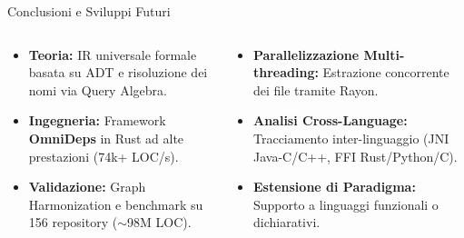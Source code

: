 \documentclass[aspectratio=169,10pt]{beamer}
\begin{document}
\begin{frame}{Conclusioni e Sviluppi Futuri}
  \vspace{0.1em}
  \begin{columns}[c,onlytextwidth]
      \begin{cookiecard}[title={Contributi Principali}]
        \small
        \begin{itemize}\setlength{\itemsep}{0.2em}
          \item \textbf{Teoria:} IR universale formale basata su ADT e risoluzione dei nomi via Query Algebra.
          \item \textbf{Ingegneria:} Framework \textbf{OmniDeps} in Rust ad alte prestazioni (74k+ LOC/s).
          \item \textbf{Validazione:} Graph Harmonization e benchmark su 156 repository ($\sim$98M LOC).
        \end{itemize}
      \end{cookiecard}

      \begin{cookiecard}[title={Direzioni Future}]
        \small
        \begin{itemize}\setlength{\itemsep}{0.2em}
          \item \textbf{Parallelizzazione Multi-threading:} Estrazione concorrente dei file tramite Rayon.
          \item \textbf{Analisi Cross-Language:} Tracciamento inter-linguaggio (JNI Java-C/C++, FFI Rust/Python/C).
          \item \textbf{Estensione di Paradigma:} Supporto a linguaggi funzionali o dichiarativi.
        \end{itemize}
      \end{cookiecard}
  \end{columns}
  \vspace{0.4em}
  \centering
   \quad {} \quad {}

\end{frame}
\end{document}

